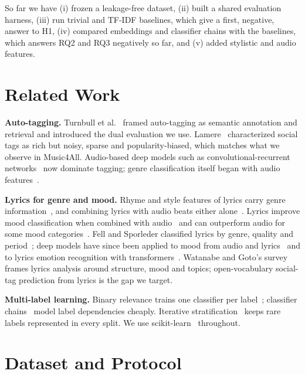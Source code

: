 \documentclass{article}
\begin{document}
So far we have (i) frozen a leakage-free dataset, (ii) built a shared evaluation harness, (iii) run trivial and TF-IDF baselines, which give a first, negative, answer to H1, (iv) compared embeddings and classifier chains with the baselines, which answers RQ2 and RQ3 negatively so far, and (v) added stylistic and audio features.

\section{Related Work}\label{sec:related}

\textbf{Auto-tagging.} Turnbull et al.~\cite{turnbull2008semantic} framed auto-tagging as semantic annotation and retrieval and introduced the dual evaluation we use. Lamere~\cite{lamere2008social} characterized social tags as rich but noisy, sparse and popularity-biased, which matches what we observe in Music4All. Audio-based deep models such as convolutional-recurrent networks~\cite{choi2017crnn} now dominate tagging; genre classification itself began with audio features~\cite{tzanetakis2002genre}.

\textbf{Lyrics for genre and mood.} Rhyme and style features of lyrics carry genre information~\cite{mayer2008rhyme}, and combining lyrics with audio beats either alone~\cite{mayer2011ensembles}. Lyrics improve mood classification when combined with audio~\cite{laurier2008multimodal,hu2009lyric} and can outperform audio for some mood categories~\cite{hu2010when}. Fell and Sporleder classified lyrics by genre, quality and period~\cite{fell2014lyrics}; deep models have since been applied to mood from audio and lyrics~\cite{delbouys2018mood} and to lyrics emotion recognition with transformers~\cite{agrawal2021transformer}. Watanabe and Goto's survey~\cite{watanabe2020lyrics} frames lyrics analysis around structure, mood and topics; open-vocabulary social-tag prediction from lyrics is the gap we target.

\textbf{Multi-label learning.} Binary relevance trains one classifier per label~\cite{tsoumakas2007overview}; classifier chains~\cite{read2011chains} model label dependencies cheaply. Iterative stratification~\cite{sechidis2011stratification} keeps rare labels represented in every split. We use scikit-learn~\cite{pedregosa2011sklearn} throughout.

\section{Dataset and Protocol}\label{sec:data}
\end{document}
